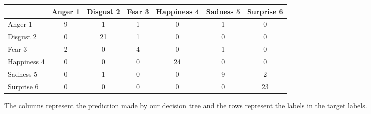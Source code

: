 \begin{figure}[h]
\begin{center}
    \begin{tabular}{ | l || c | c | c | c | c | c | }
    \hline
          & Anger 1 & Disgust 2 & Fear 3 & Happiness 4 & Sadness 5 & Surprise 6 \\ \hline \hline
        Anger 1 & 9 & 1 & 1 & 0 & 1 & 0 \\ \hline
        Disgust 2 & 0 & 21 & 1 & 0 & 0 & 0 \\ \hline
        Fear 3 & 2 & 0 & 4 & 0 & 1 & 0 \\ \hline
        Happiness 4 & 0 & 0 & 0 & 24 & 0 & 0 \\ \hline
        Sadness 5 & 0 & 1 & 0 & 0 & 9 & 2 \\ \hline
        Surprise 6 & 0 & 0 & 0 & 0 & 0 & 23 \\ \hline
    \end{tabular}
    \caption{The columns represent the prediction made by our decision tree and
    the rows represent the labels in the target labels.}
    \label{fig:confusionMatrix}
\end{center}
\end{figure}
